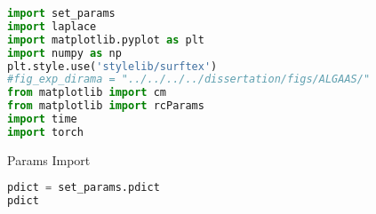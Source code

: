 \begin{spacing}{1.2} \begin{lstlisting}[frame=single, language=Python]
import set_params
import laplace
import matplotlib.pyplot as plt
import numpy as np
plt.style.use('stylelib/surftex')
#fig_exp_dirama = "../../../../dissertation/figs/ALGAAS/"
from matplotlib import cm
from matplotlib import rcParams
import time
import torch
\end{lstlisting} \end{spacing}
\noindent Params Import
\begin{spacing}{1.2} \begin{lstlisting}[frame=single, language=Python]
pdict = set_params.pdict
pdict
\end{lstlisting} \end{spacing}

